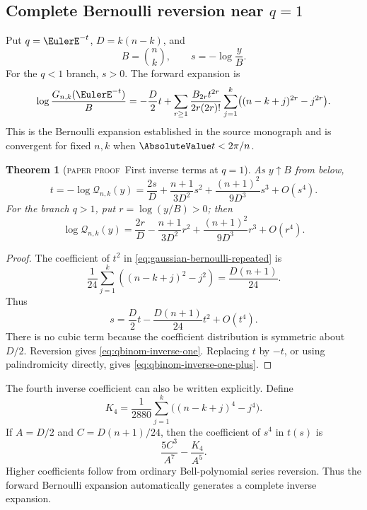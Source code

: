 \documentclass[11pt,oneside]{article}
\newtheorem{theorem}{Theorem}[section]
\theoremstyle{definition}
\theoremstyle{remark}
\theoremstyle{plain}
\theoremstyle{definition}
\theoremstyle{remark}
\newcommand{\statusproved}{\textcolor{provedgreen}{\textsc{paper proof}}}
\numberwithin{equation}{section}
\numberwithin{figure}{section}
\numberwithin{table}{section}
\let\reportsubsection\subsection
\let\reportsubsubsection\subsubsection
\let\section\reportsubsection
\let\subsection\reportsubsubsection
\begin{document}
\section{Complete Bernoulli reversion near \(q=1\)}
Put \(q=\EulerE^{-t}\), \(D=k(n-k)\), and
\[
 B=\binom nk,
 \qquad
 s=-\log\frac{y}{B}.
\]
For the \(q<1\) branch, \(s>0\).  The forward expansion is
\begin{equation}
 \log\frac{G_{n,k}(\EulerE^{-t})}{B}
 =-\frac D2t+
 \sum_{r\ge1}\frac{B_{2r}t^{2r}}{2r(2r)!}
 \sum_{j=1}^k\bigl((n-k+j)^{2r}-j^{2r}\bigr).
 \label{eq:gaussian-bernoulli-repeated}
\end{equation}
This is the Bernoulli expansion established in the source monograph and is
convergent for fixed \(n,k\) when \(\AbsoluteValue t<2\pi/n\).

\begin{theorem}[\statusproved\ First inverse terms at \(q=1\)]
As \(y\uparrow B\) from below,
\begin{equation}
 t=-\log\mathcal Q_{n,k}(y)
 =\frac{2s}{D}
 +\frac{n+1}{3D^2}s^2
 +\frac{(n+1)^2}{9D^3}s^3
 +O(s^4).
 \label{eq:qbinom-inverse-one}
\end{equation}
For the branch \(q>1\), put \(r=\log(y/B)>0\); then
\begin{equation}
 \log\mathcal Q_{n,k}(y)
 =\frac{2r}{D}
 -\frac{n+1}{3D^2}r^2
 +\frac{(n+1)^2}{9D^3}r^3
 +O(r^4).
 \label{eq:qbinom-inverse-one-plus}
\end{equation}
\end{theorem}
\begin{proof}
The coefficient of \(t^2\) in
\eqref{eq:gaussian-bernoulli-repeated} is
\[
 \frac1{24}\sum_{j=1}^k((n-k+j)^2-j^2)
 =\frac{D(n+1)}{24}.
\]
Thus
\[
 s=\frac D2t-\frac{D(n+1)}{24}t^2+O(t^4).
\]
There is no cubic term because the coefficient distribution is symmetric about
\(D/2\).  Reversion gives \eqref{eq:qbinom-inverse-one}.  Replacing \(t\) by
\(-t\), or using palindromicity directly, gives
\eqref{eq:qbinom-inverse-one-plus}.
\end{proof}

The fourth inverse coefficient can also be written explicitly.  Define
\[
 K_4=\frac1{2880}
 \sum_{j=1}^k\bigl((n-k+j)^4-j^4\bigr).
\]
If \(A=D/2\) and \(C=D(n+1)/24\), then the coefficient of \(s^4\) in
\(t(s)\) is
\[
 \frac{5C^3}{A^7}-\frac{K_4}{A^5}.
\]
Higher coefficients follow from ordinary Bell-polynomial series reversion.
Thus the forward Bernoulli expansion automatically generates a complete
inverse expansion.
\end{document}
